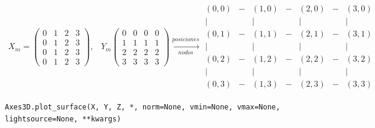 \begin{align*}
X_m=\begin{pmatrix}
0&1&2&3\\ 
0&1&2&3\\
0&1&2&3\\
0&1&2&3
\end{pmatrix},& Y_m\begin{pmatrix}
0&0&0&0\\
1&1&1&1\\
2&2&2&2\\
3&3&3&3
\end{pmatrix}\xrightarrow[nodos]{posiciones}\begin{matrix}
(0,0)&-&(1,0)&-&(2,0)&-&(3,0)\\
\vert&&\vert&&\vert&&\vert\\ 
(0,1)&-&(1,1)&-&(2,1)&-&(3,1)\\
\vert&&\vert&&\vert&&\vert\\
(0,2)&-&(1,2)&-&(2,2)&-&(3,2)\\
\vert&&\vert&&\vert&&\vert\\
(0,3)&-&(1,3)&-&(2,3)&-&(3,3)
\end{matrix}
\end{align*}


\begin{verbatim}
Axes3D.plot_surface(X, Y, Z, *, norm=None, vmin=None, vmax=None, 
lightsource=None, **kwargs)
\end{verbatim}


